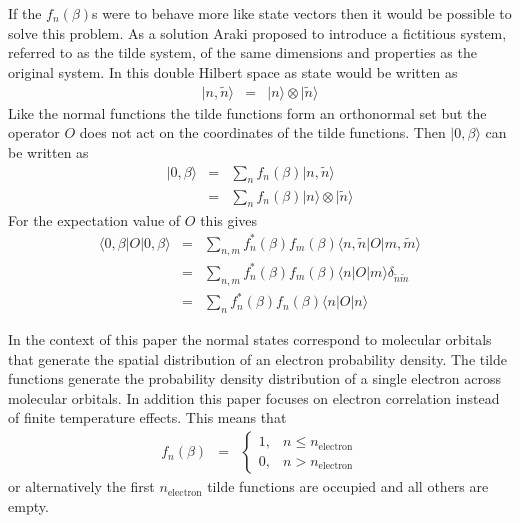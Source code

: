 \documentclass[aip,graphicx]{revtex4-1}
\begin{document}
\begin{itemize}
    If the $f_n(\beta)$s were to behave more like state vectors then it would be possible to solve this problem. As a solution Araki\cite{Araki_1963} proposed to introduce a fictitious system, referred to as the tilde system, of the same dimensions and properties as the original system. In this double Hilbert space as state would be written as
    \begin{eqnarray}
    \label{eq-normal-otimes-tilde}
    |n,\tilde{n}\rangle &=& |n\rangle \otimes |\tilde{n}\rangle
    \end{eqnarray}
    Like the normal functions the tilde functions form an orthonormal set but the operator $O$ does not act on the coordinates of the tilde functions. Then $|0,\beta\rangle$ can be written as
    \begin{eqnarray}
    |0,\beta\rangle &=& \sum_n f_n(\beta)|n,\tilde{n}\rangle \\
                    &=& \sum_n f_n(\beta)|n\rangle\otimes|\tilde{n}\rangle
    \end{eqnarray}
    For the expectation value of $O$ this gives
    \begin{eqnarray}
    \langle 0,\beta|O|0,\beta\rangle 
    &=& \sum_{n,m}f_n^*(\beta)f_m(\beta)\langle n,\tilde{n}|O|m,\tilde{m}\rangle \\
    &=& \sum_{n,m}f_n^*(\beta)f_m(\beta)\langle n|O|m\rangle \delta_{\tilde{n}\tilde{m}}\\
    &=& \sum_n f_n^*(\beta)f_n(\beta)\langle n|O|n\rangle
    \end{eqnarray}
    
    In the context of this paper the normal states correspond to molecular orbitals that generate the spatial distribution of an electron probability density. The tilde functions generate the probability density distribution of a single electron across molecular orbitals. In addition this paper focuses on electron correlation instead of finite temperature effects. This means that 
    \begin{eqnarray}
    f_n(\beta) &=& \left\{\begin{array}{cc}
      1,   & n \leq n_{\mathrm{electron}} \\
      0,   & n > n_{\mathrm{electron}}
    \end{array}\right.
    \end{eqnarray}
    or alternatively the first $n_{\mathrm{electron}}$ tilde functions are occupied and all others are empty. 
    

\end{itemize}
\end{document}
